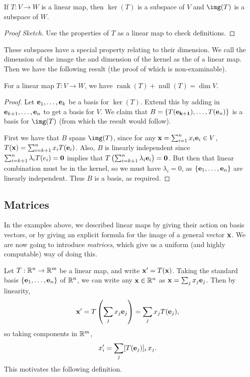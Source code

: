 \documentclass[a4paper]{scrartcl}
\newcommand{\rank}{\operatorname{rank}}
\newcommand{\nullity}{\operatorname{null}}
\begin{document}
\begin{proposition}
    If $T : V \rightarrow W$ is a linear map, then $\ker(T)$ is a subspace of $V$ and $\img(T)$ is a subspace of $W$.
\end{proposition}
\begin{proof}[Proof Sketch]
    Use the properties of $T$ as a linear map to check definitions.
\end{proof}

These subspaces have a special property relating to their dimension.
We call the dimension of the image the  and dimension of the kernel as the  of a linear map. Then we have the following result (the proof of which is non-examinable).

\begin{theorem}
    For a linear map $T: V \rightarrow W$, we have $\rank(T) + \nullity(T) = \dim V$.
\end{theorem}
\begin{proof}
    Let $\mathbf{e}_1, \dots, \mathbf{e}_k$ be a basis for $\ker (T)$. Extend this by adding in $\mathbf{e}_{k + 1}, \dots, \mathbf{e}_n$ to get a basis for $V$. We claim that $B = \{T(\mathbf{e_{k + 1}}), \dots, T(\mathbf{e}_n)\}$ is a basis for $\img (T)$ (from which the result would follow).

    First we have that $B$ spans $\img(T)$, since for any $\mathbf{x} = \sum_{i =1}^n x_i \mathbf{e}_i \in V$, $T(\mathbf{x}) = \sum_{i = k+1}^n x_i T(\mathbf{e}_i)$. Also, $B$ is linearly independent since $\sum_{i = k + 1}^n \lambda_i T(e_i) = \mathbf{0}$ implies that $T\left(\sum_{i = k + 1}^n \lambda_i \mathbf{e}_i\right) = \mathbf{0}$. But then that linear combination must be in the kernel, so we must have $\lambda_i = 0$, as $\{\mathbf{e}_1, \dots, \mathbf{e}_n\}$ are linearly independent. Thus $B$ is a basis, as required.
\end{proof}


\subsection{Matrices}

In the examples above, we described linear maps by giving their action on basis vectors, or by giving an explicit formula for the image of a general vector $\mathbf{x}$. We are now going to introduce \emph{matrices}, which give us a uniform (and highly computable) way of doing this.

Let $T : \mathbb{R}^n \rightarrow \mathbb{R}^m$ be a linear map, and write $\mathbf{x}' = T(\mathbf{x})$.
Taking the standard basis $\{\mathbf{e}_1, \dots, \mathbf{e}_n\}$ of $\mathbb{R}^n$, we can write any $\mathbf{x} \in \mathbb{R}^n$ as $\mathbf{x} = \sum_j x_j \mathbf{e}_j$. Then by linearity,
$$
\mathbf{x}' = T\left(\sum_j x_j \mathbf{e}_j\right) = \sum_j x_j T(\mathbf{e}_j),
$$
so taking components in $\mathbb{R}^m$,
$$
x_i' = \sum_j [T(\mathbf{e}_j)]_i \, x_j.
$$
This motivates the following definition.
\end{document}
